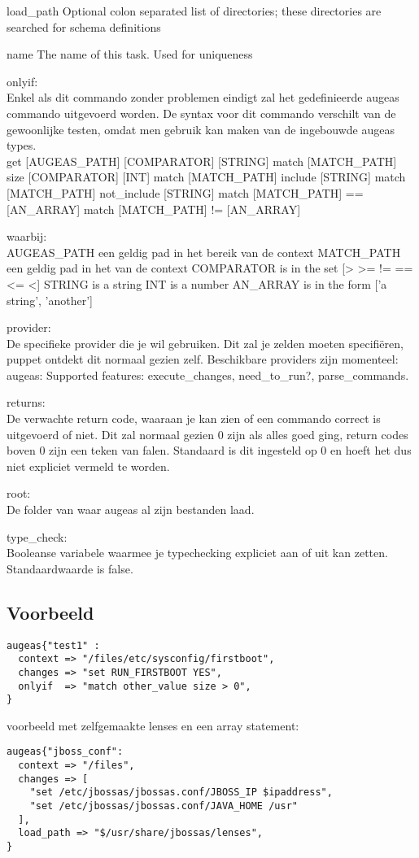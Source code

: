 load\_path
Optional colon separated list of directories; these directories are searched for schema definitions

name
The name of this task. Used for uniqueness

onlyif:\\
Enkel als dit commando zonder problemen eindigt zal het gedefinieerde augeas commando uitgevoerd worden. De syntax voor dit commando verschilt van de gewoonlijke testen, omdat men gebruik kan maken van de ingebouwde augeas types.\\
get [AUGEAS\_PATH] [COMPARATOR] [STRING]
match [MATCH\_PATH] size [COMPARATOR] [INT]
match [MATCH\_PATH] include [STRING]
match [MATCH\_PATH] not\_include [STRING]
match [MATCH\_PATH] == [AN\_ARRAY]
match [MATCH\_PATH] != [AN\_ARRAY]

waarbij:\\
AUGEAS\_PATH een geldig pad in het bereik van de context
MATCH\_PATH een geldig pad in het van de context
COMPARATOR is in the set [> >= != == <= <]
STRING is a string
INT is a number
AN\_ARRAY is in the form ['a string', 'another']

provider:\\
De specifieke provider die je wil gebruiken. Dit zal je zelden moeten specifi\"{e}ren, puppet ontdekt dit normaal gezien zelf. Beschikbare providers zijn momenteel:\\
augeas: Supported features: execute\_changes, need\_to\_run?, parse\_commands.

returns:\\
De verwachte return code, waaraan je kan zien of een commando correct is uitgevoerd of niet. Dit zal normaal gezien 0 zijn als alles goed ging, return codes boven 0 zijn een teken van falen. Standaard is dit ingesteld op 0 en hoeft het dus niet expliciet vermeld te worden.

root:\\
De folder van waar augeas al zijn bestanden laad.

type\_check:\\
Booleanse variabele waarmee je typechecking expliciet aan of uit kan zetten. Standaardwaarde is false.

\subsection{Voorbeeld}
\begin{lstlisting}
augeas{"test1" :
  context => "/files/etc/sysconfig/firstboot",
  changes => "set RUN_FIRSTBOOT YES",
  onlyif  => "match other_value size > 0",
}
\end{lstlisting}

voorbeeld met zelfgemaakte lenses en een array statement:
\begin{lstlisting}
augeas{"jboss_conf":
  context => "/files",
  changes => [
    "set /etc/jbossas/jbossas.conf/JBOSS_IP $ipaddress",
    "set /etc/jbossas/jbossas.conf/JAVA_HOME /usr"
  ],
  load_path => "$/usr/share/jbossas/lenses",
}
\end{lstlisting}
